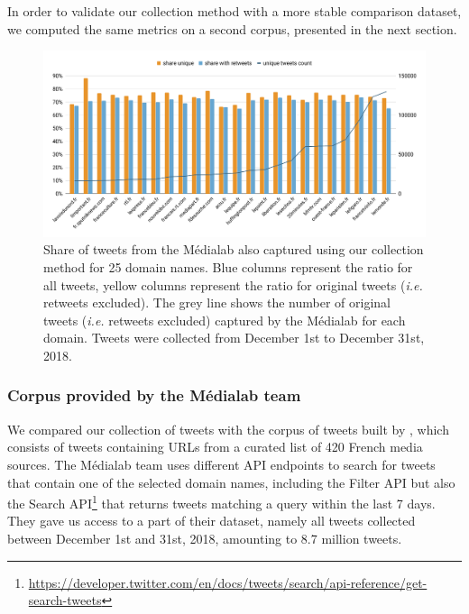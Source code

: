 In order to validate our collection method with a more stable comparison dataset, we computed the same metrics on a second corpus, presented in the next section.
\begin{figure}
\begin{center}
\includegraphics[width=1\textwidth]{figures/ShareInCommonWithMedialab.pdf}
\end{center}

\caption{Share of tweets from the Médialab also captured using our collection method for 25 domain names. Blue columns represent the ratio for all tweets, yellow columns represent the ratio for original tweets (\textit{i.e.} retweets excluded). The grey line shows the number of original tweets (\textit{i.e.} retweets excluded) captured by the Médialab for each domain. Tweets were collected from December 1st to December 31st, 2018.}
\label{Figure:HistogramUrlsMedialab}
\end{figure}
\subsubsection{Corpus provided by the Médialab team}

We compared our collection of tweets with the corpus of tweets built by \citet{cardon2019unfolding}, which consists of
tweets containing URLs from a curated list of 420 French media sources. The Médialab team uses different API endpoints to search for tweets that contain one of the selected domain names, including the Filter API but also the Search API\footnote{\url{https://developer.twitter.com/en/docs/tweets/search/api-reference/get-search-tweets}} that returns tweets matching a query within the last 7 days. They gave us access to a part of their dataset, namely all tweets collected between December 1st and 31st, 2018, amounting to 8.7 million tweets. 


